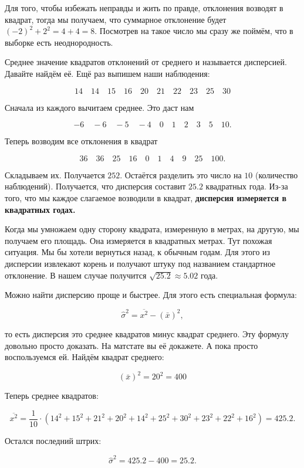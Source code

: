 \documentclass[12pt, a4paper, oneside]{article}
\theoremstyle{plain} %
\theoremstyle{definition}
\newcommand{\indef}[1]{\textbf{ \color{green} #1}}
\begin{document}
\begin{solution}
\begin{enumerate}
	Для того, чтобы избежать неправды и жить по правде, отклонения возводят в квадрат, тогда мы получаем, что суммарное отклонение будет $(-2)^2 + 2^2 = 4 + 4 = 8$. Посмотрев на такое число мы сразу же поймём, что в выборке есть неоднородность. 
	
	Среднее значение квадратов отклонений от среднего и называется дисперсией. Давайте найдём её. Ещё раз выпишем наши наблюдения: 
	
	\[
	14 \quad 14  \quad 15  \quad 16  \quad 20  \quad 21  \quad 22  \quad 23  \quad 25  \quad 30
	\]
	
	Сначала из каждого вычитаем среднее. Это даст нам
	
	\[
	-6 \quad -6  \quad -5  \quad -4  \quad 0  \quad 1 \quad 2  \quad 3  \quad 5  \quad 10.
	\]
	
	Теперь возводим все отклонения в квадрат
	
	\[
	36 \quad 36  \quad 25  \quad 16 \quad 0  \quad 1 \quad 4  \quad 9 \quad 25  \quad 100.
	\]
	
	Складываем их.  Получается $252$. Остаётся разделить это число на  $10$ (количество наблюдений). Получается, что дисперсия составит $25.2$ квадратных года.  Из-за того, что мы каждое слагаемое возводили в квадрат, \indef{дисперсия измеряется в квадратных годах.}
	
	Когда мы умножаем одну сторону квадрата, измеренную в метрах, на другую, мы получаем его площадь. Она измеряется в квадратных метрах. Тут похожая ситуация. Мы бы хотели вернуться назад, к обычным годам. Для этого из дисперсии извлекают корень и получают штуку под названием стандартное отклонение. В нашем случае получится $\sqrt{25.2} \approx 5.02$ года. 
	
	
	Можно найти дисперсию проще и быстрее. Для этого есть специальная формула: 

	$$
	\hat \sigma^2 = \overline{x^2} - (\bar x)^2,
	$$
	
	то есть дисперсия это среднее квадратов минус квадрат среднего. Эту формулу довольно просто доказать. На матстате вы её докажете. А пока просто воспользуемся ей. Найдём квадрат среднего:
	
	$$
	(\bar x)^2 = 20^2 = 400
	$$
	
	Теперь среднее квадратов: 
	
	$$
	\overline{x^2} = \frac{1}{10} \cdot (14^2 + 15^2 + 21^2 + 20^2 + 14^2 + 25^2 + 30^2 + 23^2 + 22^2 + 16^2) = 425.2.
	$$
	
	Остался последний штрих: 
	
	$$
	\hat \sigma^2 = 425.2 - 400 = 25.2.
	$$
	

\end{enumerate}
\end{solution}
\end{document}
